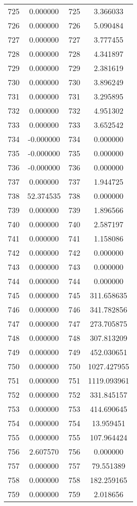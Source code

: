 \documentclass[12pt]{article}
\begin{document}
\begin{longtable}{@{}cccc@{}}
725 & 0.000000 & 725 & 3.366033 \\
726 & 0.000000 & 726 & 5.090484 \\
727 & 0.000000 & 727 & 3.777455 \\
728 & 0.000000 & 728 & 4.341897 \\
729 & 0.000000 & 729 & 2.381619 \\
730 & 0.000000 & 730 & 3.896249 \\
731 & 0.000000 & 731 & 3.295895 \\
732 & 0.000000 & 732 & 4.951302 \\
733 & 0.000000 & 733 & 3.652542 \\
734 & -0.000000 & 734 & 0.000000 \\
735 & -0.000000 & 735 & 0.000000 \\
736 & -0.000000 & 736 & 0.000000 \\
737 & 0.000000 & 737 & 1.944725 \\
738 & 52.374535 & 738 & 0.000000 \\
739 & 0.000000 & 739 & 1.896566 \\
740 & 0.000000 & 740 & 2.587197 \\
741 & 0.000000 & 741 & 1.158086 \\
742 & 0.000000 & 742 & 0.000000 \\
743 & 0.000000 & 743 & 0.000000 \\
744 & 0.000000 & 744 & 0.000000 \\
745 & 0.000000 & 745 & 311.658635 \\
746 & 0.000000 & 746 & 341.782856 \\
747 & 0.000000 & 747 & 273.705875 \\
748 & 0.000000 & 748 & 307.813209 \\
749 & 0.000000 & 749 & 452.030651 \\
750 & 0.000000 & 750 & 1027.427955 \\
751 & 0.000000 & 751 & 1119.093961 \\
752 & 0.000000 & 752 & 331.845157 \\
753 & 0.000000 & 753 & 414.690645 \\
754 & 0.000000 & 754 & 13.959451 \\
755 & 0.000000 & 755 & 107.964424 \\
756 & 2.607570 & 756 & 0.000000 \\
757 & 0.000000 & 757 & 79.551389 \\
758 & 0.000000 & 758 & 182.259165 \\
759 & 0.000000 & 759 & 2.018656 \\

\end{longtable}
\end{document}
